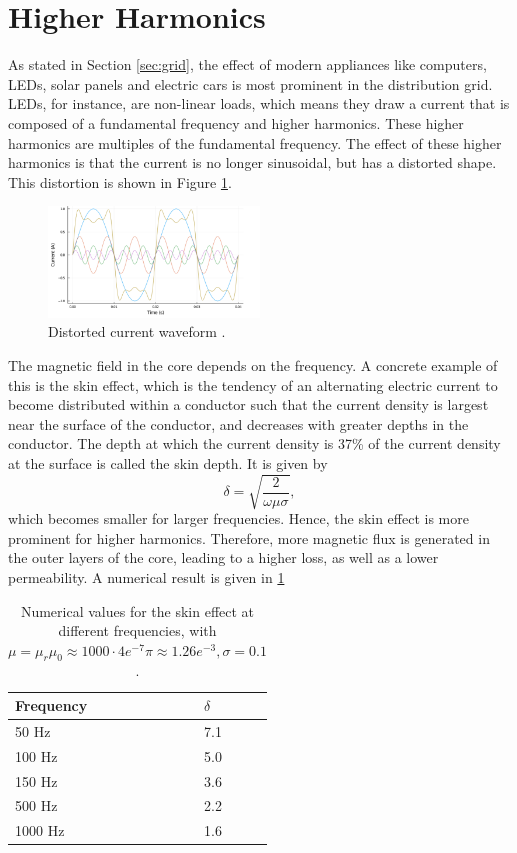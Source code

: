 \section{Higher Harmonics}
As stated in Section \ref{sec:grid}, the effect of modern appliances like computers, LEDs, solar panels and electric cars is most prominent in the distribution grid.
LEDs, for instance, are non-linear loads, which means they draw a current that is composed of a fundamental frequency and higher harmonics.
These higher harmonics are multiples of the fundamental frequency. The effect of these higher harmonics is that the current is no longer sinusoidal, but has a distorted shape.
This distortion is shown in Figure \ref{fig:higherharmonics}.
\begin{figure}[H]
    \centering
    \includegraphics[width=0.5\textwidth]{img/higher_harmonics.png}
    \caption{Distorted current waveform \cite{vanDijk2022}.}
    \label{fig:higherharmonics}
\end{figure}
The magnetic field in the core depends on the frequency. A concrete example of this is the skin effect, which is the tendency of an alternating electric current to become distributed within a conductor 
such that the current density is largest near the surface of the conductor, and decreases with greater depths in the conductor.
The depth at which the current density is 37\% of the current density at the surface is called the skin depth. It is given by \citehere
\begin{equation}
    \delta = \sqrt{\frac{2}{\omega \mu \sigma}},
\end{equation}
which becomes smaller for larger frequencies. Hence, the skin effect is more prominent for higher harmonics. Therefore, more magnetic flux is generated in the outer layers of the core, leading to a higher loss, as well as a lower permeability. A numerical result is given in \cref{tab:skin_effect}

\begin{table}
    \centering
    \begin{tabular}{l|l}
        Frequency & $\delta$ \\
        \hline
        50 Hz   & 7.1 \\
        100 Hz  & 5.0 \\
        150 Hz  & 3.6 \\
        500 Hz  & 2.2 \\
        1000 Hz & 1.6 \\
    \end{tabular}
    \caption{Numerical values for the skin effect at different frequencies, with $\mu = \mu_r\mu_0 \approx 1000 \cdot 4e^{-7} \pi \approx 1.26e^{-3}, \sigma = 0.1$.}
    \label{tab:skin_effect}
\end{table}


